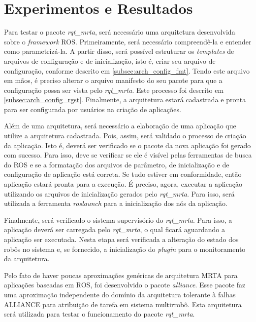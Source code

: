 \chapter[Experimentos e Resultados]{Experimentos e Resultados} \label{cap:resultados}
    Para testar o pacote \textit{rqt\_mrta}, será necessário uma arquitetura desenvolvida sobre o \textit{framework} ROS. Primeiramente, será necessário compreendê-la e entender como parametrizá-la. A partir disso, será possível estruturar os \textit{templates} de arquivos de configuração e de inicialização, isto é, criar seu arquivo de configuração, conforme descrito em \ref{subsec:arch_config_fmt}. Tendo este arquivo em mãos, é preciso alterar o arquivo manifesto do seu pacote para que a configuração possa ser vista pelo \textit{rqt\_mrta}. Este processo foi descrito em \ref{subsec:arch_config_rgst}. Finalmente, a arquitetura estará cadastrada e pronta para ser configurada por usuários na criação de aplicações.
    
    Além de uma arquitetura, será necessário a elaboração de uma aplicação que utilize a arquitetura cadastrada. Pois, assim, será validado o processo de criação da aplicação. Isto é, deverá ser verificado se o pacote da nova aplicação foi gerado com sucesso. Para isso, deve se verificar se ele é visível pelas ferramentas de busca do ROS e se a formatação dos arquivos de parâmetro, de inicialização e de configuração de aplicação está correta. Se tudo estiver em conformidade, então aplicação estará pronta para a execução. É preciso, agora, executar a aplicação utilizando os arquivos de inicialização gerados pelo \textit{rqt\_mrta}. Para isso, será utilizada a ferramenta \textit{roslaunch} para a inicialização dos nós da aplicação. 
    
    Finalmente, será verificado o sistema supervisório do \textit{rqt\_mrta}. Para isso, a aplicação deverá ser carregada pelo \textit{rqt\_mrta}, o qual ficará aguardando a aplicação ser executada. Nesta etapa será verificada a alteração do estado dos robôs no sistema e, se fornecido, a inicialização do \textit{plugin} para o monitoramento da arquitetura.
    
    Pelo fato de haver poucas aproximações genéricas de arquitetura MRTA para aplicações baseadas em ROS, foi desenvolvido o pacote \textit{alliance}. Esse pacote faz uma aproximação independente do domínio da arquitetura tolerante à falhas ALLIANCE \cite{ref:parker1998alliance} para atribuição de tarefa em sistema multirrobô. Esta arquitetura será utilizada para testar o funcionamento do pacote \textit{rqt\_mrta}. 
    
